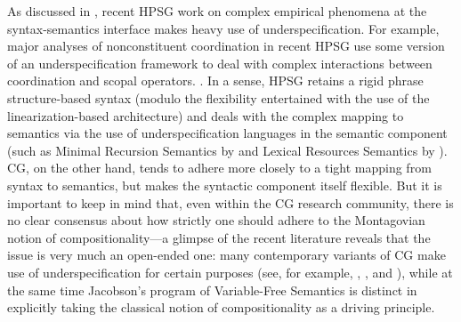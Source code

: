 \documentclass[output=paper
                ,modfonts
                ,nonflat
	        ,collection
	        ,collectionchapter
	        ,collectiontoclongg
 	        ,biblatex
                ,babelshorthands
                ,newtxmath
                ,draftmode
                ,colorlinks, citecolor=brown
]{./langsci/langscibook}
\begin{document}



As discussed in , recent HPSG work on
complex empirical phenomena at the syntax-semantics interface makes
heavy use of underspecification. For example, major analyses of
nonconstituent coordination in recent HPSG use some version of an
underspecification framework to deal with complex interactions between
coordination and scopal operators.
\citep{Yatabe2001a,BS2004a,parkea18gapping,parkDiss,yatabe-tam2017}.
In a sense, HPSG retains a rigid phrase structure-based syntax (modulo
the flexibility entertained with the use of the linearization-based
architecture) and deals with the complex mapping to semantics via the
use of underspecification languages in the semantic component (such as
Minimal Recursion Semantics by \citealt{CFPS2005a} and Lexical Resources
Semantics by \citealt{RS2004a-u}). CG, on the other hand, tends to adhere
more closely to a tight mapping from syntax to semantics, but makes
the syntactic component itself flexible. But it is important to keep
in mind that, even within the CG research community,
there is no clear consensus about 
how strictly one should adhere to the
Montagovian notion of compositionality---a glimpse of the recent 
literature reveals that the issue is very much an open-ended one: 
many contemporary variants of CG 
make use of underspecification for certain purposes (see, for example, 
\citealt{steedman2012}, \citealt{bekki14},
\citealt{bekkimineshima17} and \citealt{kubotaEA2019Geach}), 
while at the same time Jacobson's 
\citeyearpar{jacobson1999a,jacobson2000a} program of Variable-Free
Semantics is distinct in explicitly taking the classical notion of compositionality
as a driving principle.
\end{document}
